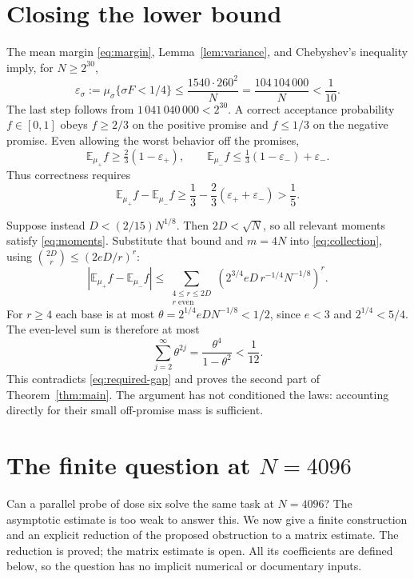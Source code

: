 \documentclass[11pt]{article}
\newcommand{\E}{\mathbb E}
\newcommand{\1}{\mathbf 1}
\begin{document}
\section{Closing the lower bound}\label{sec:closing}
The mean margin \eqref{eq:margin}, Lemma~\ref{lem:variance}, and
Chebyshev's inequality imply, for $N\ge2^{30}$,
\begin{equation}\label{eq:failure}
 \varepsilon_\sigma:=\mu_\sigma\{\sigma F<1/4\}
 \le\frac{1540\cdot260^2}{N}
 =\frac{104\,104\,000}{N}<\frac1{10}.
\end{equation}
The last step follows from $1\,041\,040\,000<2^{30}$.
A correct acceptance probability $f\in[0,1]$ obeys $f\ge2/3$
on the positive promise and $f\le1/3$ on the negative promise.
Even allowing the worst behavior off the promises,
\[
 \E_{\mu_+}f\ge\tfrac23(1-\varepsilon_+),\qquad
 \E_{\mu_-}f\le\tfrac13(1-\varepsilon_-)+\varepsilon_-.
\]
Thus correctness requires
\begin{equation}\label{eq:required-gap}
 \E_{\mu_+}f-\E_{\mu_-}f
 \ge\frac13-\frac23(\varepsilon_++\varepsilon_-)>\frac15.
\end{equation}

Suppose instead $D<(2/15)N^{1/8}$. Then $2D<\sqrt N$, so all
relevant moments satisfy \eqref{eq:moments}.
Substitute that bound and $m=4N$ into \eqref{eq:collection}, using
$\binom{2D}{r}\le(2eD/r)^r$:
\[
 |\E_{\mu_+}f-\E_{\mu_-}f|
 \le\sum_{\substack{4\le r\le2D\\r\text{ even}}}
        \left(2^{3/4}eD\,r^{-1/4}N^{-1/8}\right)^r.
\]
For $r\ge4$ each base is at most
$\theta=2^{1/4}eDN^{-1/8}<1/2$, since $e<3$ and $2^{1/4}<5/4$.
The even-level sum is therefore at most
\[
             \sum_{j=2}^{\infty}\theta^{2j}
             =\frac{\theta^4}{1-\theta^2}<\frac1{12}.
\]
This contradicts \eqref{eq:required-gap} and proves the second part
of Theorem~\ref{thm:main}. The argument has not conditioned the laws:
accounting directly for their small off-promise mass is sufficient.

\section{The finite question at \texorpdfstring{$N=4096$}{N=4096}}\label{sec:finite}
Can a parallel probe of dose six solve the same task at $N=4096$?
The asymptotic estimate is too weak to answer this. We now give a finite
construction and an explicit reduction of the proposed obstruction to a
matrix estimate. The reduction is proved; the matrix estimate is open.
All its coefficients are defined below, so the question has no implicit
numerical or documentary inputs.
\end{document}
